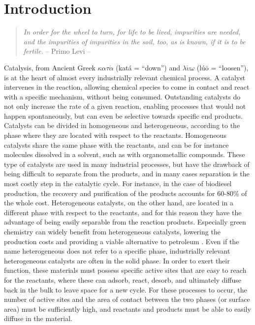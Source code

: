 \graphicspath{{figures/chapter1/}}
\renewcommand\evenpagerightmark{{\scshape\small Introduction}}
\renewcommand\oddpageleftmark{{\scshape\small Chapter 1}}


\hyphenation{}

\chapter[Introduction]%
{Introduction}
\label{ch1}

\begin{flushright}
\begin{quotation}
\textit{In order for the wheel to turn, for life to be lived, impurities are needed, and the impurities of impurities in the soil, too, as is known, if it is to be fertile.} -- Primo Levi --
\end{quotation}
\end{flushright}
\npar
Catalysis, from Ancient Greek $\kappa\alpha\tau\acute{\alpha}$ (kat\'a = ``down'') and $\lambda\acute{\upsilon}\omega$ (l\'u\=o = ``loosen''), is at the heart of almost every industrially relevant chemical process. A catalyst intervenes in the reaction, allowing chemical species to come in contact and react with a specific mechanism, without being consumed. Outstanding catalysts do not only increase the rate of a given reaction, enabling processes that would not happen spontaneously, but can even be selective towards specific end products. Catalysts can be divided in homogeneous and heterogeneous, according to the phase where they are located with respect to the reactants. Homogeneous catalysts share the same phase with the reactants, and can be for instance molecules dissolved in a solvent, such as with organometallic compounds. These type of catalysts are used in many industrial processes, but have the drawback of being difficult to separate from the products, and in many cases separation is the most costly step in the catalytic cycle. For instance, in the case of biodiesel production, the recovery and purification of the products accounts for 60-80\% of the whole cost\cite{atadashi2011biodiesel}.
\npar
Heterogeneous catalysts, on the other hand, are located in a different phase with respect to the reactants, and for this reason they have the advantage of being easily separable from the reaction products. Especially green chemistry can widely benefit from heterogeneous catalysts, lowering the production costs and providing a viable alternative to petroleum \cite{chouhan2011modern}. Even if the name heterogeneous does not refer to a specific phase, industrially relevant heterogeneous catalysts are often in the solid phase. In order to exert their function, these materials must possess specific active sites that are easy to reach for the reactants, where these can adsorb, react, desorb, and ultimately diffuse back in the bulk to leave space for a new cycle. For these processes to occur, the number of active sites and the area of contact between the two phases (or surface area) must be sufficiently high, and reactants and products must be able to easily diffuse in the material. 
